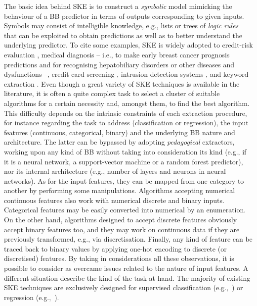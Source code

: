 \documentclass[
]{ceurart}
\begin{document}
The basic idea behind SKE is to construct a \emph{symbolic} model mimicking the behaviour of a BB predictor in terms of outputs corresponding to given inputs.
%
Symbols may consist of intelligible knowledge, e.g., lists or trees of \emph{logic rules} that can be exploited to obtain predictions as well as to better understand the underlying predictor.
%
To cite some examples, SKE is widely adopted to credit-risk evaluation \cite{baesens2003using,baesens2001building,steiner2006using}, medical diagnosis -- i.e., to make early breast cancer prognosis predictions \cite{franco2007early} and for recognising hepatobiliary disorders \cite{hayashi2000comparison} or other diseases and dysfunctions \cite{bologna1997three} --, credit card screening \cite{setiono2011rule}, intrusion detection systems \cite{hofmann2003rule}, and keyword extraction \cite{azcarraga2012keyword}.
%
Even though a great variety of SKE techniques is available in the literature, it is often a quite complex task to select a cluster of suitable algorithms for a certain necessity and, amongst them, to find the best algorithm.
%
This difficulty depends on the intrinsic constraints of each extraction procedure, for instance regarding the task to address (classification or regression), the input features (continuous, categorical, binary) and the underlying BB nature and architecture.
%
The latter can be bypassed by adopting \emph{pedagogical} extractors, working upon any kind of BB without taking into consideration its kind (e.g., if it is a neural network, a support-vector machine or a random forest predictor), nor its internal architecture (e.g., number of layers and neurons in neural networks).
%
As for the input features, they can be mapped from one category to another by performing some manipulations.
%
Algorithms accepting numerical continuous features also work with numerical discrete and binary inputs.
%
Categorical features may be easily converted into numerical by an enumeration.
%
On the other hand, algorithms designed to accept discrete features obviously accept binary features too, and they may work on continuous data if they are previously transformed, e.g., via discretisation.
%
Finally, any kind of feature can be traced back to binary values by applying one-hot encoding to discrete (or discretised) features.
%
By taking in considerations all these observations, it is possible to consider as overcame issues related to the nature of input features.
%
A different situation describe the kind of the task at hand.
%
The majority of existing SKE techniques are exclusively designed for supervised classification (e.g.,~\cite{craven1994using,craven1996extracting}) or regression (e.g.,~\cite{huysmans2006iter,gridex-extraamas2021}).
\end{document}
